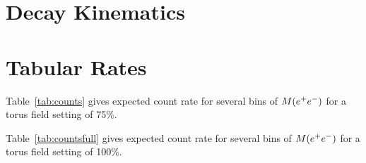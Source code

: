 \section{Decay Kinematics}\label{sec:app.kinematics}



\section{Tabular Rates}\label{sec:app.rates}
Table~\ref{tab:counts} gives expected count rate for several bins of $M(e^+e^-)$ for a torus field setting of 75\%.

Table~\ref{tab:countsfull} gives expected count rate for several bins of $M(e^+e^-)$ for a torus field setting of 100\%.
